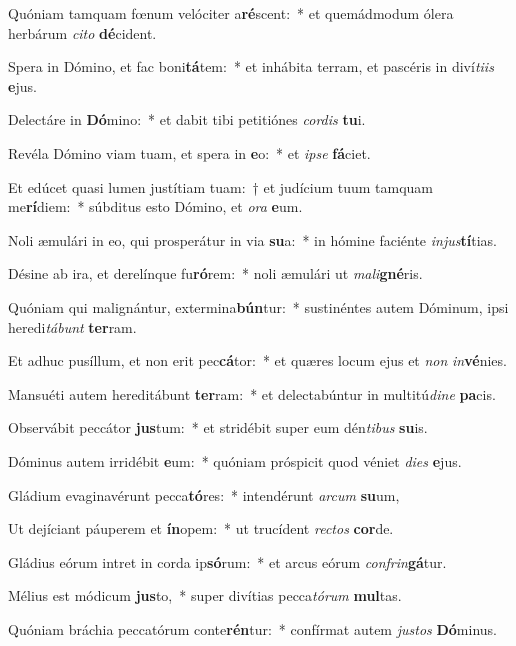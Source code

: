 \item Quóniam tamquam fœnum velóciter a\textbf{ré}scent:~* et quemádmodum ólera herbárum \textit{ci}\textit{to} \textbf{dé}cident.
\item Spera in Dómino, et fac boni\textbf{tá}tem:~* et inhábita terram, et pascéris in diví\textit{ti}\textit{is} \textbf{e}jus.
\item Delectáre in \textbf{Dó}mino:~* et dabit tibi petitiónes \textit{cor}\textit{dis} \textbf{tu}i.
\item Revéla Dómino viam tuam, et spera in \textbf{e}o:~* et \textit{ip}\textit{se} \textbf{fá}ciet.
\item Et edúcet quasi lumen justítiam tuam:~† et judícium tuum tamquam me\textbf{rí}diem:~* súbditus esto Dómino, et \textit{o}\textit{ra} \textbf{e}um.
\item Noli æmulári in eo, qui prosperátur in via \textbf{su}a:~* in hómine faciénte \textit{in}\textit{jus}\textbf{tí}tias.
\item Désine ab ira, et derelínque fu\textbf{ró}rem:~* noli æmulári ut \textit{ma}\textit{li}\textbf{gné}ris.
\item Quóniam qui malignántur, extermina\textbf{bún}tur:~* sustinéntes autem Dóminum, ipsi heredi\textit{tá}\textit{bunt} \textbf{ter}ram.
\item Et adhuc pusíllum, et non erit pec\textbf{cá}tor:~* et quæres locum ejus et \textit{non} \textit{in}\textbf{vé}nies.
\item Mansuéti autem hereditábunt \textbf{ter}ram:~* et delectabúntur in multitú\textit{di}\textit{ne} \textbf{pa}cis.
\item Observábit peccátor \textbf{jus}tum:~* et stridébit super eum dén\textit{ti}\textit{bus} \textbf{su}is.
\item Dóminus autem irridébit \textbf{e}um:~* quóniam próspicit quod véniet \textit{di}\textit{es} \textbf{e}jus.
\item Gládium evaginavérunt pecca\textbf{tó}res:~* intendérunt \textit{ar}\textit{cum} \textbf{su}um,
\item Ut dejíciant páuperem et \textbf{ín}opem:~* ut trucídent \textit{rec}\textit{tos} \textbf{cor}de.
\item Gládius eórum intret in corda ip\textbf{só}rum:~* et arcus eórum \textit{con}\textit{frin}\textbf{gá}tur.
\item Mélius est módicum \textbf{jus}to,~* super divítias pecca\textit{tó}\textit{rum} \textbf{mul}tas.
\item Quóniam bráchia peccatórum conte\textbf{rén}tur:~* confírmat autem \textit{jus}\textit{tos} \textbf{Dó}minus.
